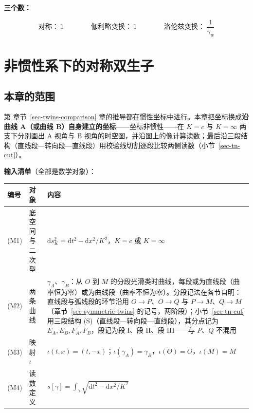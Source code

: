 \documentclass[
  chinese,
  a4paper,
  UTF8,
  12pt,
  oneside,
  openany]{ctexbook}
\newcounter{none} %
\theoremstyle{plain}
\theoremstyle{plain}
\theoremstyle{plain}
\theoremstyle{definition}
\theoremstyle{plain}
\theoremstyle{plain}
\theoremstyle{remark}
\begin{document}
\textbf{三个数：}

\[
\text{对称：}\ 1\qquad\qquad
\text{伽利略变换：}\ 1\qquad\qquad
\text{洛伦兹变换：}\ \frac{1}{\gamma_w}
\]


\chapter{非惯性系下的对称双生子}\label{sec-twins-noninertial}

\section{本章的范围}\label{sec-tn-scope}

第 章节~\ref{sec-twins-comparison}
章的推导都在惯性坐标中进行。本章把坐标换成\textbf{沿曲线 A（或曲线
B）自身建立的坐标}------坐标非惯性------在 \(K=c\) 与 \(K=\infty\)
两支下分别画出 A 视角与 B
视角的时空图，并沿图上的像计算读数；最后沿三段结构（直线段---转向段---直线段）用校验线切割逐段比较两侧读数（小节~\ref{sec-tn-cut}）。

\textbf{输入清单}（全部是数学对象）：

{\def\LTcaptype{none} %
\begin{longtable}[]{@{}
  >{\raggedright\arraybackslash}p{}
  >{\raggedright\arraybackslash}p{}
  >{\raggedright\arraybackslash}p{}@{}}
\toprule\noalign{}
\begin{minipage}[b]{\linewidth}\raggedright
编号
\end{minipage} & \begin{minipage}[b]{\linewidth}\raggedright
对象
\end{minipage} & \begin{minipage}[b]{\linewidth}\raggedright
内容
\end{minipage} \\
\midrule\noalign{}
\endhead
\bottomrule\noalign{}
\endlastfoot
(M1) & 底空间与二次型 &
\(\mathrm{d}s^{2}_{K}=\mathrm{d}t^{2}-\mathrm{d}x^{2}/K^{2}\)，\(K=c\)
或 \(K=\infty\) \\
(M2) & 两条曲线 & \(\gamma_A\)、\(\gamma_B\)：从 \(O\) 到 \(M\)
的分段光滑类时曲线，每段或为直线段（曲率恒为零）或为曲线段（曲率不恒为零）。分段记法在各节自明：直线段与弧线段的环节沿用
\(O\to P\)、\(O\to Q\) 与
\(P\to M\)、\(Q\to M\)（章节~\ref{sec-symmetric-twins}
的记号，两阶段）；小节~\ref{sec-tn-cut} 用三段结构
(S)（直线段---转向段---直线段），其分点记为
\(E_A,E_B,F_A,F_B\)，段记为段 I、段 II、段 III------与 \(P\)、\(Q\)
不混用 \\
(M3) & 映射 \(\iota\) &
\(\iota(t,x)=(t,-x)\)；\(\iota(\gamma_A)=\gamma_B\)，\(\iota(O)=O\)，\(\iota(M)=M\) \\
(M4) & 读数定义 &
\(s[\gamma]=\displaystyle\int_{\gamma}\sqrt{\mathrm{d}t^{2}-\mathrm{d}x^{2}/K^{2}}\) \\
\end{longtable}
}
\end{document}
